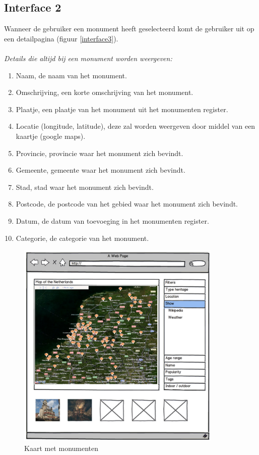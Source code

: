 \documentclass[a4paper,10pt]{article}
\begin{document}
			\subsection{Interface 2}
			Wanneer de gebruiker een monument heeft geselecteerd komt de gebruiker uit op een detailpagina (figuur \ref{interface3}).\\
			\\
			\textit{Details die altijd bij een monument worden weergeven:}
			\begin{enumerate}
				\item Naam, de naam van het monument.
				\item Omschrijving, een korte omschrijving van het monument.
				\item Plaatje, een plaatje van het monument uit het monumenten register.
				\item Locatie (longitude, latitude), deze zal worden weergeven door middel van een kaartje (google maps).
				\item Provincie, provincie waar het monument zich bevindt.
				\item Gemeente, gemeente waar het monument zich bevindt.
				\item Stad, stad waar het monument zich bevindt.
				\item Postcode, de postcode van het gebied waar het monument zich bevindt.
				\item Datum, de datum van toevoeging in het monumenten register.
				\item Categorie, de categorie van het monument.
			\end{enumerate}
			
			\begin{figure}[ht!]
				\centering
				\includegraphics[height=10cm]{interface1.png}
				\caption{Kaart met monumenten \label{interface1}}
			\end{figure}
			
\end{document}
